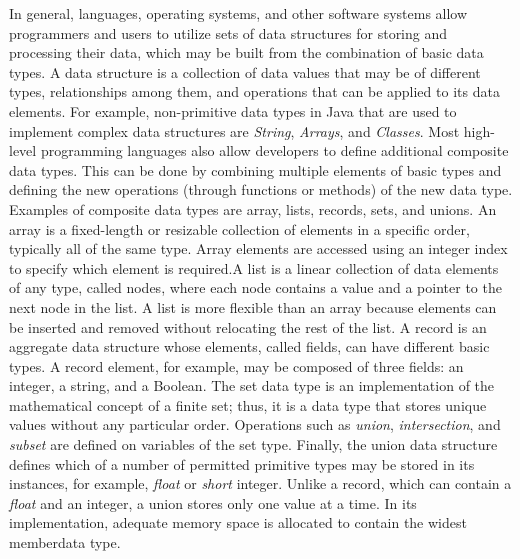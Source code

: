 In general, languages, operating systems, and other software systems allow programmers and users to utilize sets of data structures for storing and processing their data, which may be built from the combination of basic data types. A data structure is a collection of data values that may be of different types, relationships among them, and operations that can be applied to its data elements. For example, non-primitive data types in Java that are used to implement complex data structures are \textit{String}, \textit{Arrays}, and \textit{Classes}. Most high-level programming languages also allow developers to define additional composite data types. This can be done by combining multiple elements of basic types and defining the new operations (through functions or methods) of the new data type. Examples of composite data types are array, lists, records, sets, and unions. An array is a fixed-length or resizable collection of elements in a specific order, typically all of the same type. Array elements are accessed using an integer index to specify which element is required.\break A list is a linear collection of data elements of any type, called nodes, where each node contains a value and a pointer to the next node in the list. A list is more flexible than an array because elements can be inserted and removed without relocating the rest of the list. A record is an aggregate data structure whose elements, called fields, can have different basic types. A record element, for example, may be composed of three fields: an integer, a string, and a Boolean. The set data type is an implementation of the mathematical concept of a finite set; thus, it is a data type that stores unique values without any particular order. Operations such as \textit{union}, \textit{intersection}, and \textit{subset} are defined on variables of the set type. Finally, the union data structure defines which of a number of permitted primitive types may be stored in its instances, for example, \textit{float} or \textit{short} integer. Unlike a record, which can contain a \textit{float} and an integer, a union stores only one value at a time. In its implementation, adequate memory space is allocated to contain the widest member\break data type.


